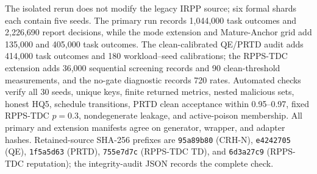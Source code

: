 \documentclass[journal]{IEEEtran}
\begin{document}
The isolated rerun does not modify the legacy IRPP source; six formal shards
each contain five seeds. The primary run records 1,044,000 task outcomes and
2,226,690 report decisions, while the mode extension and Mature-Anchor grid add
135,000 and 405,000 task outcomes. The clean-calibrated QE/PRTD audit adds
414,000 task outcomes and 180 workload--seed calibrations; the RPPS-TDC
extension adds 36,000 sequential screening records and 90 clean-threshold
measurements, and the no-gate diagnostic records 720 rates. Automated checks
verify all 30 seeds, unique keys, finite returned metrics, nested malicious
sets, honest HQ5, schedule transitions, PRTD clean acceptance within
0.95--0.97, fixed RPPS-TDC $p=0.3$, nondegenerate leakage, and active-poison
membership. All primary and extension manifests agree on generator, wrapper,
and adapter hashes. Retained-source SHA-256 prefixes are \texttt{95a89b80}
(CRH-N), \texttt{e4242705} (QE), \texttt{1f5a5d63} (PRTD),
\texttt{755e7d7c} (RPPS-TDC TD), and \texttt{6d3a27c9} (RPPS-TDC reputation);
the integrity-audit JSON records the complete check.
\let\section\originalsection
\end{document}
